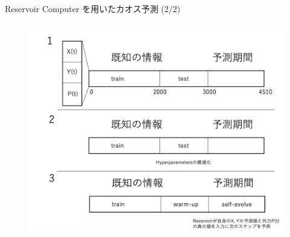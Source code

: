\begin{frame}{Reservoir Computer を用いたカオス予測 (2/2)}
\begin{columns}[T]
    \begin{column}{.5\textwidth}
    \begin{figure}
        \includegraphics[width=\textwidth]{Fig/please.png}
    \end{figure}   
    \end{column}
\end{columns}
\end{frame}
